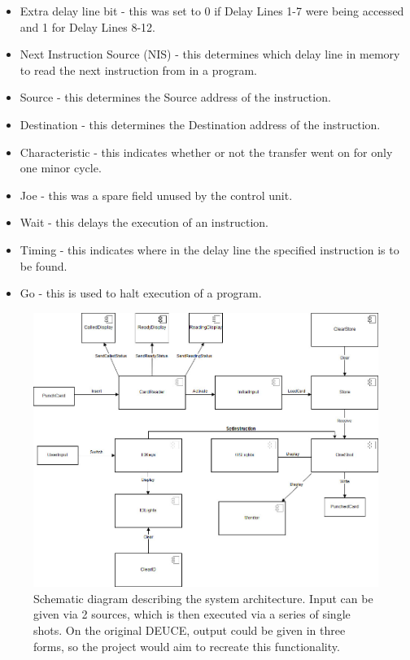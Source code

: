 \documentclass{l4proj}
\begin{document}
\begin{itemize}
	\item Extra delay line bit - this was set to 0 if Delay Lines 1-7 were being accessed and 1 for Delay Lines 8-12.
	\item Next Instruction Source (NIS) - this determines which delay line in memory to read the next instruction from in a program.
	\item Source - this determines the Source address of the instruction.
	\item Destination - this determines the Destination address of the instruction.
	\item Characteristic - this indicates whether or not the transfer went on for only one minor cycle.
	\item Joe - this was a spare field unused by the control unit.
	\item Wait - this delays the execution of an instruction.
	\item Timing - this indicates where in the delay line the specified instruction is to be found.
	\item Go - this is used to halt execution of a program.
\end{itemize}


\begin{figure}[h]
	\centering
	\includegraphics[width=\linewidth]{images/deuce-uml}
	\caption{Schematic diagram describing the system architecture. Input can be given via 2 sources, which is then executed via a series of single shots. On the original DEUCE, output could be given in three forms, so the project would aim to recreate this functionality.}
    \label{fig:schema}
\end{figure}
	
\end{document}
